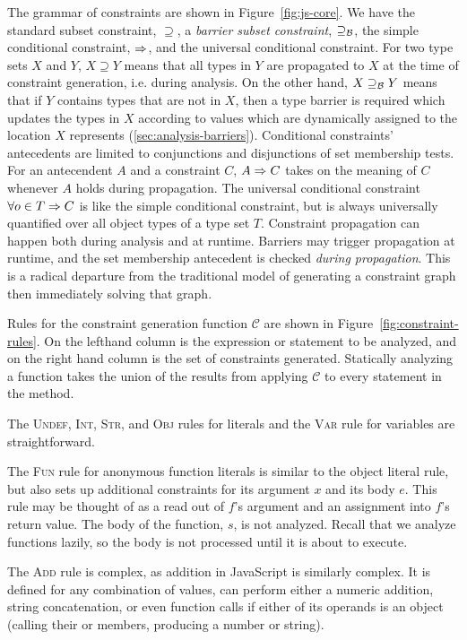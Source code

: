 The grammar of constraints are shown in Figure~\ref{fig:js-core}. We have the
standard subset constraint, $\supseteq$, a \emph{barrier subset
  constraint}, $\supseteq_\mathcal{B}$, the simple conditional constraint, $\Rightarrow$, and the universal conditional constraint.
For two type sets $X$ and $Y$, $X \supseteq
Y$ means that all types in $Y$ are propagated to $X$ at the time of constraint generation, i.e. during analysis. On the other hand, $X
\supseteq_\mathcal{B} Y$ means that if $Y$ contains types that are not in $X$, then a
type barrier is required which updates the types in $X$
according to values which are dynamically assigned to the location
$X$ represents (\Section\ref{sec:analysis-barriers}).
Conditional constraints' antecedents are limited to conjunctions and
disjunctions of set membership tests. For an antecendent $A$ and a constraint
$C$, $A \Rightarrow C$ takes on the meaning of $C$ whenever $A$ holds during
propagation. The universal conditional constraint $\forall o \in T \Rightarrow C$
is like the simple conditional constraint, but is always universally
quantified over all object types of a type set $T$.
Constraint propagation can happen both during analysis and at runtime.
Barriers may trigger propagation at runtime, and the set membership
antecedent is checked \emph{during propagation}. This is a radical departure from the
traditional model of generating a constraint graph then immediately solving
that graph.

Rules for the constraint generation function $\mathcal{C}$ are shown in
Figure~\ref{fig:constraint-rules}. On the lefthand column is the expression or
statement to be analyzed, and on the right hand column is the set of constraints
generated. Statically analyzing a function takes the union of
the results from applying $\mathcal{C}$ to every statement in the method.

The \textsc{Undef}, \textsc{Int}, \textsc{Str}, and \textsc{Obj}
rules for literals and the \textsc{Var} rule for variables are
straightforward.

The \textsc{Fun} rule for anonymous function literals is similar to the object
literal rule, but also sets up additional constraints for its argument $x$ and
its body $e$. This rule may be thought of as a read out of $f$'s argument and an
assignment into $f$'s return value. The body of the function, $s$, is not analyzed. Recall that we analyze functions lazily, so the body is not processed until it is about to execute.

The \textsc{Add} rule is complex, as addition in JavaScript is similarly complex. It is
defined for any combination of values, can perform either a numeric addition,
string concatenation, or even function calls if either of its operands is an
object (calling their  or  members, producing a
number or string).

